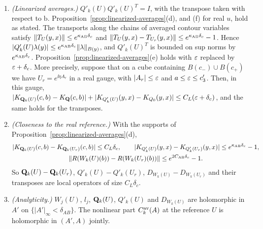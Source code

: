 \begin{proposition}
\begin{enumerate}[label=(\roman*)]
\item \emph{(Linearized averages.)} $Q'_k(U)Q'_k(U)^T=I$, with the transpose taken with respect to $\mathrm b$. Proposition~\ref{prop:linearized-averages}(d), and (f) for real $u$, hold as stated. The transports along the chains of averaged contour variables satisfy $\|T_U(y,x)\|\le e^{\kappa_{\rm AB}\delta_c}$ and $\|T_U(y,x)-T_{U_r}(y,x)\|\le e^{\kappa_{\rm AB}\delta_c}-1$. Hence $|Q'_k(U)\lambda(y)|\le e^{\kappa_{\rm AB}\delta_c}\|\lambda\|_{B(y)}$, and $Q'_k(U)^T$ is bounded on sup norms by $e^{\kappa_{\rm AB}\delta_c}$. Proposition~\ref{prop:linearized-averages}(e) holds with $\varepsilon$ replaced by $\varepsilon+\delta_c$. More precisely, suppose that on a cube containing $B(c_-)\cup B(c_+)$ we have $U_r=e^{\ii\eta A_r}$ in a real gauge, with $|A_r|\le\varepsilon$ and $a\le\varepsilon\le c'_3$. Then, in this gauge, $|K_{\mathbf Q_k(U)}(c,b)-K_{\mathbf Q}(c,b)|+|K_{Q'_k(U)}(y,x)-K_{Q_0}(y,x)|\le C_L(\varepsilon+\delta_c)$, and the same holds for the transposes.
\item \emph{(Closeness to the real reference.)} With the supports of Proposition~\ref{prop:linearized-averages}(d),
\begin{gather*}
|K_{\mathbf Q_k(U)}(c,b)-K_{\mathbf Q_k(U_r)}(c,b)|\le C_L\delta_c,\qquad |K_{Q'_k(U)}(y,x)-K_{Q'_k(U_r)}(y,x)|\le e^{\kappa_{\rm AB}\delta_c}-1,\\
\|R(W_k(U)(b))-R(W_k(U_r)(b))\|\le e^{2C_{\rm AB}\delta_c}-1 .
\end{gather*}
So $\mathbf Q_k(U)-\mathbf Q_k(U_r)$, $Q'_k(U)-Q'_k(U_r)$, $D_{W_k(U)}-D_{W_k(U_r)}$ and their transposes are local operators of size $C_L\delta_c$.
\item \emph{(Analyticity.)} $W_j(U)$, $l_j$, $\mathbf Q_k(U)$, $Q'_k(U)$ and $D_{W_k(U)}$ are holomorphic in $A'$ on $\{|A'|_\infty<\delta_{AB}\}$. The nonlinear part $C^{\rm av}_k(A)$ at the reference $U$ is holomorphic in $(A',A)$ jointly.
\end{enumerate}
\end{proposition}

